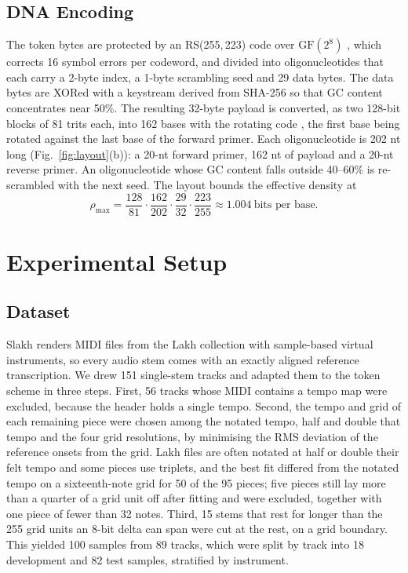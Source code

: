 \documentclass[conference]{IEEEtran}
\begin{document}
\subsection{DNA Encoding}

The token bytes are protected by an RS(255,\,223) code over $\mathrm{GF}(2^8)$ \cite{reed}, which corrects 16 symbol errors per codeword, and divided into oligonucleotides that each carry a 2-byte index, a 1-byte scrambling seed and 29 data bytes. The data bytes are XORed with a keystream derived from SHA-256 so that GC content concentrates near 50\%. The resulting 32-byte payload is converted, as two 128-bit blocks of 81 trits each, into 162 bases with the rotating code \cite{goldman}, the first base being rotated against the last base of the forward primer. Each oligonucleotide is 202 nt long (Fig.~\ref{fig:layout}(b)): a 20-nt forward primer, 162 nt of payload and a 20-nt reverse primer. An oligonucleotide whose GC content falls outside 40--60\% is re-scrambled with the next seed. The layout bounds the effective density at
\begin{equation}
\rho_{\max} = \frac{128}{81}\cdot\frac{162}{202}\cdot\frac{29}{32}\cdot\frac{223}{255} \approx 1.004\ \text{bits per base}.
\label{eq:ceiling}
\end{equation}

\section{Experimental Setup}

\subsection{Dataset}
\label{subsec:dataset}

Slakh \cite{slakh} renders MIDI files from the Lakh collection with sample-based virtual instruments, so every audio stem comes with an exactly aligned reference transcription. We drew 151 single-stem tracks and adapted them to the token scheme in three steps. First, 56 tracks whose MIDI contains a tempo map were excluded, because the header holds a single tempo. Second, the tempo and grid of each remaining piece were chosen among the notated tempo, half and double that tempo and the four grid resolutions, by minimising the RMS deviation of the reference onsets from the grid. Lakh files are often notated at half or double their felt tempo and some pieces use triplets, and the best fit differed from the notated tempo on a sixteenth-note grid for 50 of the 95 pieces; five pieces still lay more than a quarter of a grid unit off after fitting and were excluded, together with one piece of fewer than 32 notes. Third, 15 stems that rest for longer than the 255 grid units an 8-bit delta can span were cut at the rest, on a grid boundary. This yielded 100 samples from 89 tracks, which were split by track into 18 development and 82 test samples, stratified by instrument.
\end{document}
